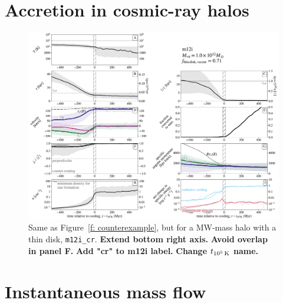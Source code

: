 \documentclass[fleqn,usenatbib]{mnras}
\newcommand{\tcon}{t_{10^5\,{\rm K}}}
\begin{document}
\section{Accretion in cosmic-ray halos}
\label{s: appendix-crs}

\begin{figure}
\includegraphics[width=\textwidth]{figures/before_and_after/before_and_after_allone_m12i_cr.pdf}
\caption{
Same as Figure~\ref{f: counterexample}, but for a MW-mass halo with a thin disk, \texttt{m12i\_cr}.
\textbf{Extend bottom right axis.}
\textbf{Avoid overlap in panel F.}
\textbf{Add "cr" to m12i label.}
\textbf{Change $\tcon$ name.}
}
\label{f: before and after m12i cr}
\end{figure}

\section{Instantaneous mass flow}
\label{s: appendix-mass flow}
\end{document}
